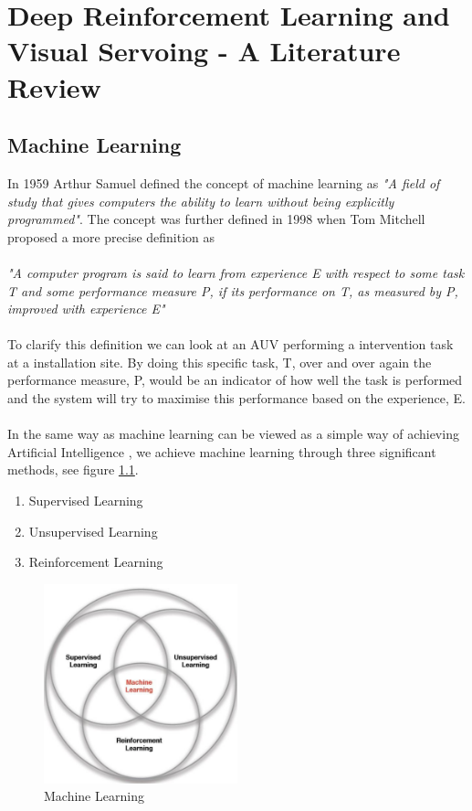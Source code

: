 \chapter{Deep Reinforcement Learning and Visual Servoing - A Literature Review}\label{chap: deep}
\section{Machine Learning}
In 1959 Arthur Samuel \cite{Puget} defined the concept of machine learning as \textit{"A field of study that gives computers the ability to learn without being explicitly programmed"}. The concept was further defined in 1998 when Tom Mitchell \cite{Puget} proposed a more precise definition as\\\\
\textit{"A computer program is said to learn from experience E with respect to some task T and some performance measure P, if its performance on T, as measured by P, improved with experience E"}\\\\
To clarify this definition we can look at an AUV performing a intervention task at a installation site. By doing this specific task, T, over and over again the performance measure, P, would be an indicator of how well the task is performed and the system will try to maximise this performance based on the experience, E.\\\\In the same way as machine learning can be viewed as a simple way of achieving Artificial Intelligence \cite{McClelland}, we achieve machine learning through three significant methods, see figure \ref{fig:ML}.
\begin{enumerate}
    \item Supervised Learning
    \item Unsupervised Learning
    \item Reinforcement Learning 
\end{enumerate}
\begin{figure}[H]
    \centering
    \includegraphics[width=0.5\textwidth]{images/chap2/ML.png}
    \caption{Machine Learning}
    \label{fig:ML}
\end{figure}
